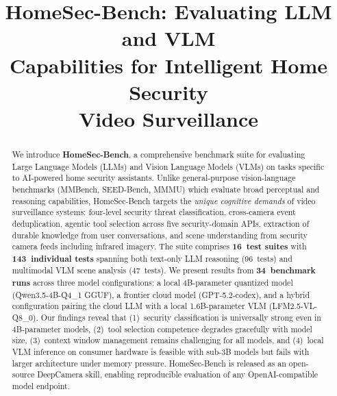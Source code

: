 \documentclass[conference]{IEEEtran}
\begin{document}
\title{HomeSec-Bench: Evaluating LLM and VLM\\
Capabilities for Intelligent Home Security\\Video Surveillance}

\author{
}

\maketitle


\begin{abstract}
We introduce \textbf{HomeSec-Bench}, a comprehensive benchmark suite for
evaluating Large Language Models (LLMs) and Vision Language Models (VLMs) on
tasks specific to AI-powered home security assistants. Unlike general-purpose
vision-language benchmarks (MMBench, SEED-Bench, MMMU) which evaluate broad
perceptual and reasoning capabilities, HomeSec-Bench targets the
\emph{unique cognitive demands} of video surveillance systems: four-level
security threat classification, cross-camera event deduplication, agentic
tool selection across five security-domain APIs, extraction of durable
knowledge from user conversations, and scene understanding from security
camera feeds including infrared imagery. The suite comprises
\textbf{16~test suites} with \textbf{143~individual tests} spanning both
text-only LLM reasoning (96~tests) and multimodal VLM scene analysis
(47~tests). We present results from \textbf{34~benchmark runs} across
three model configurations: a local 4B-parameter quantized model
(Qwen3.5-4B-Q4\_1 GGUF), a frontier cloud model (GPT-5.2-codex), and a
hybrid configuration pairing the cloud LLM with a local 1.6B-parameter
VLM (LFM2.5-VL-Q8\_0). Our findings reveal that (1)~security
classification is universally strong even in 4B-parameter models,
(2)~tool selection competence degrades gracefully with model size,
(3)~context window management remains challenging for all models, and
(4)~local VLM inference on consumer hardware is feasible with sub-3B
models but fails with larger architecture under memory pressure.
HomeSec-Bench is released as an open-source DeepCamera skill, enabling
reproducible evaluation of any OpenAI-compatible model endpoint.
\end{abstract}
\end{document}

